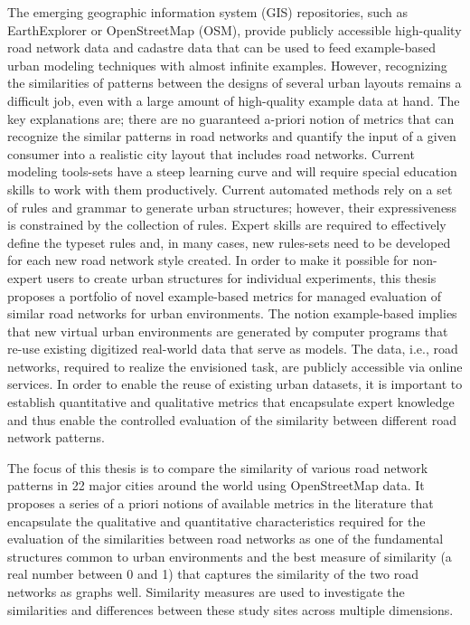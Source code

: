 
The emerging geographic information system (GIS) repositories, such as EarthExplorer or OpenStreetMap (OSM), provide publicly accessible high-quality road network data and cadastre data that can be used to feed example-based urban modeling techniques with almost infinite examples. However, recognizing the similarities of patterns between the designs of several urban layouts remains a difficult job, even with a large amount of high-quality example data at hand. The key explanations are;  there are no guaranteed a-priori notion of metrics that can recognize the similar patterns in road networks and quantify the input of a given consumer into a realistic city layout that includes road networks.  Current modeling tools-sets have a steep learning curve and will require special education skills to work with them productively. Current automated methods rely on a set of rules and grammar to generate urban structures; however, their expressiveness is constrained by the collection of rules. Expert skills are required to effectively define the typeset rules and, in many cases, new rules-sets need to be developed for each new road network style created. In order to make it possible for non-expert users to create urban structures for individual experiments, this thesis proposes a portfolio of novel example-based metrics for managed evaluation of similar road networks for urban environments. The notion example-based implies that new virtual urban environments are generated by computer programs that re-use existing digitized real-world data that serve as models. The data, i.e., road networks, required to realize the envisioned task, are publicly accessible via online services. In order to enable the reuse of existing urban datasets, it is important to establish quantitative and qualitative metrics that encapsulate expert knowledge and thus enable the controlled evaluation of the similarity between different road network patterns.  

The focus of this thesis is to compare the similarity of various road network patterns in 22 major cities around the world using OpenStreetMap data. It proposes a series of a priori notions of available metrics in the literature that encapsulate the qualitative and quantitative characteristics required for the evaluation of the similarities between road networks as one of the fundamental structures common to urban environments and the best measure of similarity (a real number between 0 and 1) that captures the similarity of the two road networks as graphs well. Similarity measures are used to investigate the similarities and differences between these study sites across multiple dimensions.

